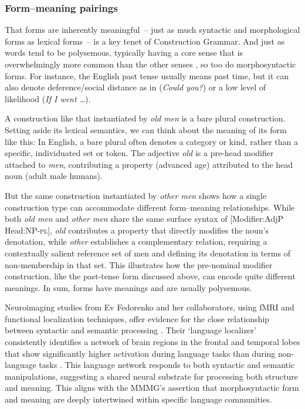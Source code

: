\documentclass[12pt,letterpaper]{article}
\begin{document}
\subsubsection{Form--meaning pairings}


That forms are inherently meaningful~-- just as much syntactic and morphological forms as lexical forms~-- is a key tenet of Construction Grammar. And just as words tend to be polysemous, typically having a core sense that is overwhelmingly more common  than the other senses \autocite{Kilgarriff2004}, so too do morphosyntactic forms. For instance, the English past tense usually means past time, but it can also denote deference/social distance as in (\textit{Could you?}) or a low level of likelihood (\textit{If I went \dots}).

A construction like that instantiated by \textit{old men} is a bare plural construction. Setting aside its lexical semantics, we can think about the meaning of its form like this: In English, a bare plural often denotes a category or kind, rather than a specific, individuated set or token. The adjective \textit{old} is a pre-head modifier attached to \textit{men}, contributing a property (advanced age) attributed to the head noun (adult male humans).

But the same construction instantiated by \textit{other men} shows how a single construction type can accommodate different form--meaning relationships. While both \textit{old men} and \textit{other men} share the same surface syntax of [Modifier:AdjP Head:NP-\textsc{pl}], \textit{old} contributes a property that directly modifies the noun's denotation, while \textit{other} establishes a complementary relation, requiring a contextually salient reference set of men and defining its denotation in terms of non-membership in that set. This illustrates how the pre-nominal modifier construction, like the past-tense form discussed above, can encode quite different meanings. In sum, forms have meanings and are usually polysemous.

Neuroimaging studies from Ev Fedorenko and her collaborators, using fMRI and functional localization techniques, offer evidence for the close relationship between syntactic and semantic processing \autocite{Fedorenko2011, Fedorenko2012, Fedorenko2024}. Their `language localizer' consistently identifies a network of brain regions in the frontal and temporal lobes that show significantly higher activation during language tasks than during non-language tasks \autocite{Fedorenko2010,}. This language network responds to both syntactic and semantic manipulations, suggesting a shared neural substrate for processing both structure and meaning. This aligns with the MMMG's assertion that morphosyntactic form and meaning are deeply intertwined within specific language communities.
\end{document}
